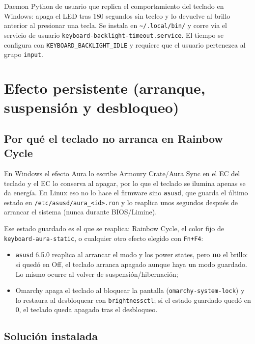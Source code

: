 \documentclass[12pt,a4paper]{article}
\begin{document}
Daemon Python de usuario que replica el comportamiento del teclado en Windows:
apaga el LED tras 180 segundos sin tecleo y lo devuelve al brillo anterior al
presionar una tecla. Se instala en \texttt{\textasciitilde/.local/bin/} y corre
vía el servicio de usuario \texttt{keyboard-backlight-timeout.service}. El
tiempo se configura con \texttt{KEYBOARD\_BACKLIGHT\_IDLE} y requiere que el
usuario pertenezca al grupo \texttt{input}.

\section{Efecto persistente (arranque, suspensión y desbloqueo)}
\label{sec:arranque}

\subsection*{Por qué el teclado no arranca en Rainbow Cycle}

En Windows el efecto Aura lo escribe Armoury Crate/Aura Sync en el EC del
teclado y el EC lo conserva al apagar, por lo que el teclado se ilumina apenas
se da energía. En Linux eso no lo hace el firmware sino \texttt{asusd}, que
guarda el último estado en \texttt{/etc/asusd/aura\_<id>.ron} y lo reaplica
unos segundos después de arrancar el sistema (nunca durante BIOS/Limine).

Ese estado guardado es el que se reaplica: Rainbow Cycle, el color fijo de
\texttt{keyboard-aura-static}, o cualquier otro efecto elegido con \texttt{Fn+F4}:

\begin{itemize}[nosep]
  \item \texttt{asusd} 6.5.0 reaplica al arrancar el modo y los power states,
        pero \textbf{no} el brillo: si quedó en Off, el teclado arranca
        apagado aunque haya un modo guardado. Lo mismo ocurre al volver de
        suspensión/hibernación;
  \item Omarchy apaga el teclado al bloquear la pantalla
        (\texttt{omarchy-system-lock}) y lo restaura al desbloquear con
        \texttt{brightnessctl}; si el estado guardado quedó en 0, el teclado
        queda apagado tras el desbloqueo.
\end{itemize}

\subsection*{Solución instalada}
\end{document}
